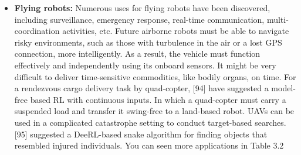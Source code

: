 \documentclass[12pt,twoside,a4]{mwbk}
\begin{document}
\begin{itemize}
\item \textbf{Flying robots:} Numerous uses for flying robots have been discovered, including surveillance, emergency response, real-time communication, multi-coordination activities, etc. Future airborne robots must be able to navigate risky environments, such as those with turbulence in the air or a lost GPS connection, more intelligently. As a result, the vehicle must function effectively and independently using its onboard sensors. It might be very difficult to deliver time-sensitive commodities, like bodily organs, on time. For a rendezvous cargo delivery task by quad-copter, [94] have suggested a model-free based RL with continuous inputs. In which a quad-copter must carry a suspended load and transfer it swing-free to a land-based robot. UAVs can be used in a complicated catastrophe setting to conduct target-based searches. [95] suggested a DeeRL-based snake algorithm for finding objects that resembled injured individuals. You can seen more applications in Table 3.2


\end{itemize}
\end{document}

